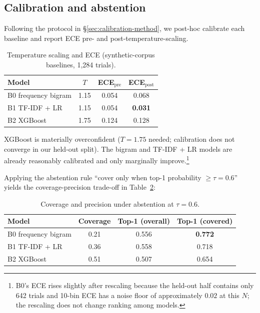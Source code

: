 \documentclass[preprint,authoryear,1p,12pt]{elsarticle}
\begin{document}
\subsection{Calibration and abstention}
\label{sec:calibration}

Following the protocol in \S\ref{sec:calibration-method}, we post-hoc
calibrate each baseline and report ECE pre- and post-temperature-scaling.

\begin{table}[h!]
\centering
\caption{Temperature scaling and ECE (synthetic-corpus baselines, 1{,}284 trials).}
\label{tab:calibration}
\begin{tabular}{lccc}
\toprule
Model & \(T\) & ECE\(_{\text{pre}}\) & ECE\(_{\text{post}}\) \\
\midrule
B0 frequency bigram     & 1.15 & 0.054 & 0.068 \\
B1 TF-IDF + LR          & 1.15 & 0.054 & \textbf{0.031} \\
B2 XGBoost              & 1.75 & 0.124 & 0.128 \\
\bottomrule
\end{tabular}
\end{table}

XGBoost is materially overconfident (\(T{=}1.75\) needed; calibration
does not converge in our held-out split). The bigram and TF-IDF + LR
models are already reasonably calibrated and only marginally
improve.\footnote{B0's ECE rises slightly after rescaling because the
held-out half contains only 642 trials and 10-bin ECE has a noise floor
of approximately $0.02$ at this $N$; the rescaling does not change
ranking among models.}

Applying the abstention rule
``cover only when top-1 probability \(\geq \tau{=}0.6\)'' yields the
coverage-precision trade-off in Table~\ref{tab:abstention}:

\begin{table}[h!]
\centering
\caption{Coverage and precision under abstention at \(\tau{=}0.6\).}
\label{tab:abstention}
\begin{tabular}{lccc}
\toprule
Model & Coverage & Top-1 (overall) & Top-1 (covered) \\
\midrule
B0 frequency bigram     & 0.21 & 0.556 & \textbf{0.772} \\
B1 TF-IDF + LR          & 0.36 & 0.558 & 0.718 \\
B2 XGBoost              & 0.51 & 0.507 & 0.654 \\
\bottomrule
\end{tabular}
\end{table}
\end{document}
